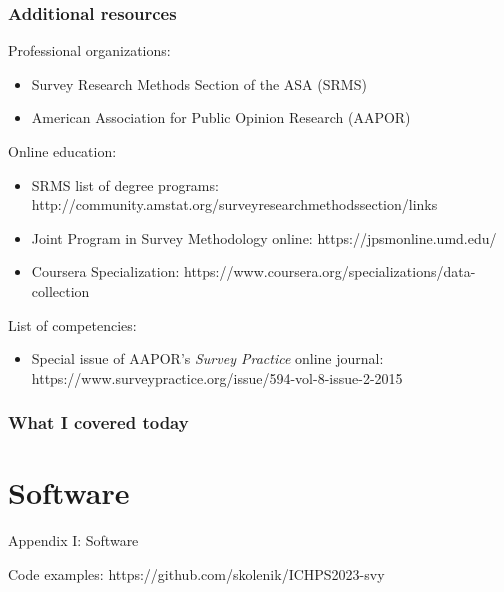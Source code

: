 \documentclass[handout]{beamer}
\begin{document}
\begin{frame}\frametitle{Additional resources}

Professional organizations:
\begin{itemize}
    \item Survey Research Methods Section of the ASA (SRMS)
    \item American Association for Public Opinion Research (AAPOR)
\end{itemize}

Online education:
\begin{itemize}
    \item SRMS list of degree programs: http://community.amstat.org/surveyresearchmethodssection/links
    \item Joint Program in Survey Methodology online: https://jpsmonline.umd.edu/
    \item Coursera Specialization: https://www.coursera.org/specializations/data-collection
\end{itemize}

List of competencies:
\begin{itemize}
    \item Special issue of AAPOR's \textit{Survey Practice} online journal: https://www.surveypractice.org/issue/594-vol-8-issue-2-2015
\end{itemize}

\end{frame}

\begin{frame}
    \frametitle{What I covered today}
    \tableofcontents
\end{frame}

\appendix

\section{Software}

\begin{frame}

\centering

{\Large Appendix I: Software}

\bigskip

\bigskip

Code examples: https://github.com/skolenik/ICHPS2023-svy

\end{frame}
\end{document}

